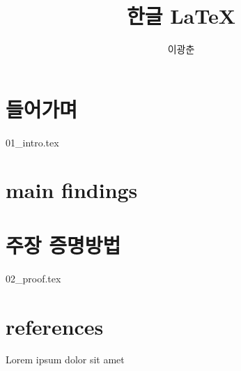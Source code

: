 \documentclass{article}
\begin{document}
	\title{한글 \LaTeX}
	\author{이광춘}
	\maketitle
	
	\abstract{}
		{\selectfont
			\lipsum[1]	
		}
	\section{들어가며}
			{01_intro.tex}
	\section{main findings}
		\lipsum[1-2]
	\section{주장 증명방법}
			{02_proof.tex}
	\section{references}
		Lorem \autocite{sigfridsson}
		ipsum \autocite{worman}
		dolor \autocite{nussbaum}
		sit \autocite{sigfridsson}
		amet \autocite{geer}	
	\printbibliography
\end{document}
